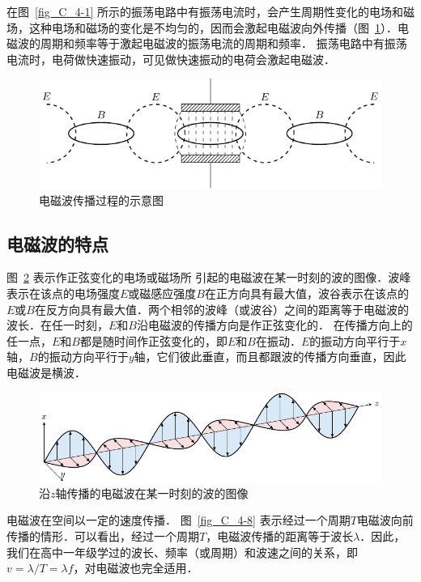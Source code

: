 在图~\ref{fig_C_4-1} 所示的振荡电路中有振荡电流时，会产生周期性变化的电场和磁场，这种电场和磁场的变化是不均匀的，因而会激起电磁波向外传播（图~\ref{fig_C_4-6}）．电磁波的周期和频率等于激起电磁波的振荡电流的周期和频率．
振荡电路中有振荡
电流时，电荷做快速振动，可见做快速振动的电荷会激起电磁波．
\begin{figure}[htbp]
	\centering
	\includegraphics{fig/C/4-6.pdf}
	\caption{电磁波传播过程的示意图}\label{fig_C_4-6}
\end{figure}


\subsection{电磁波的特点}


图~\ref{fig_C_4-7} 表示作正弦变化的电场或磁场所
引起的电磁波在某一时刻的波的图像．波峰表示在该点的电场强度$E$或磁感应强度$B$在正方向具有最大值，波谷表示在该点的$E$或$B$在反方向具有最大值．两个相邻的波峰（或波谷）之间的距离等于电磁波的波长．在任一时刻，$E$和$B$沿电磁波的传播方向是作正弦变化的．
在传播方向上的任一点，$E$和$B$都是随时间作正弦变化的，即$E$和$B$在振动．$E$的振动方向平行于$x$轴，$B$的振动方向平行于$y$轴，它们彼此垂直，而且都跟波的传播方向垂直，因此电磁波是横波．

\begin{figure}[htbp]
	\centering
	\includegraphics{fig/C/4-7.pdf}
	\caption{沿$z$轴传播的电磁波在某一时刻的波的图像}\label{fig_C_4-7}
\end{figure}




电磁波在空间以一定的速度传播．
图~\ref{fig_C_4-8} 表示经过一个周期$T$电磁波向前传播的情形．可以看出，经过一个周期$T$，电磁波传播的距离等于波长$\lambda$．因此，我们在高中一年级学过的波长、频率（或周期）和波速之间的关系，即$v=\lambda/T=\lambda f$，对电磁波也完全适用．

